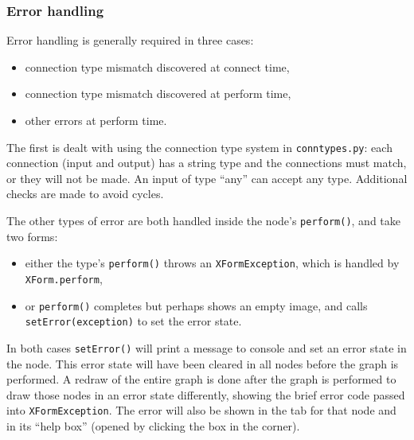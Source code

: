 \subsubsection{Error handling}
\label{errorhandling}
Error handling is generally required in three cases:
\begin{itemize}
\item connection type mismatch discovered at connect time,
\item connection type mismatch discovered at perform time,
\item other errors at perform time.
\end{itemize}
The first is dealt with using the connection type system
in \texttt{conntypes.py}: each connection (input and output) has a string
type and the connections must match, or they will not be made. An input
of type ``any'' can accept any type. Additional checks are made to avoid
cycles.

The other types of error are both handled inside the node's \texttt{perform()},
and take two forms:
\begin{itemize}
\item either the type's \texttt{perform()} throws an \texttt{XFormException}, which
is handled by \texttt{XForm.perform},
\item or \texttt{perform()} completes but perhaps shows an empty image,
and calls \texttt{setError(exception)} to set the error state.
\end{itemize}
In both cases \texttt{setError()} will print a message to console and
set an error state in the node. This error state
will have been cleared in all nodes before the graph is performed. A redraw of the
entire graph is done after the graph is performed to
draw those nodes in an error state differently, showing the 
brief error code passed into \texttt{XFormException}. The error
will also be shown in the tab for that node and in its ``help box''
(opened by clicking the box in the corner).

